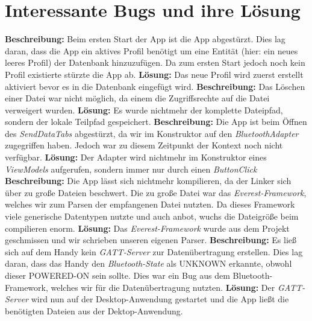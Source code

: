 \documentclass[a4paper]{scrreprt}
\begin{document}
\chapter{Interessante Bugs und ihre Lösung}
\textbf{Beschreibung:} Beim ersten Start der App ist die App abgestürzt. Dies lag daran, dass die App ein aktives Profil benötigt um eine Entität (hier: ein neues leeres Profil) der Datenbank hinzuzufügen. Da zum ersten Start jedoch noch kein Profil existierte stürzte die App ab.
\textbf{Lösung:} Das neue Profil wird zuerst erstellt aktiviert bevor es in die Datenbank eingefügt wird. \newline \newline
\textbf{Beschreibung:} Das Löschen einer Datei war nicht möglich, da einem die Zugriffsrechte auf die Datei verweigert wurden. \newline
\textbf{Lösung:} Es wurde nichtmehr der komplette Dateipfad, sondern der lokale Teilpfad gespeichert. \newline \newline
\textbf{Beschreibung:} Die App ist beim Öffnen des \textit{SendDataTabs} abgestürzt, da wir im Konstruktor auf den \textit{BluetoothAdapter} zugegriffen haben. Jedoch war zu diesem Zeitpunkt der Kontext noch nicht verfügbar. \newline
\textbf{Lösung:} Der Adapter wird nichtmehr im Konstruktor eines \textit{ViewModels} aufgerufen, sondern immer nur durch einen \textit{ButtonClick} \newline \newline
\textbf{Beschreibung: }Die App lässt sich nichtmehr kompilieren, da der Linker sich über zu große Dateien beschwert. Die zu große Datei war das \textit{Everest-Framework}, welches wir zum Parsen der empfangenen Datei nutzten. Da dieses Framework viele generische Datentypen nutzte und auch anbot, wuchs die Dateigröße beim compilieren enorm.\newline
\textbf{Lösung: }Das \textit{Everest-Framework} wurde aus dem Projekt geschmissen und wir schrieben unseren eigenen Parser. \newline \newline
\textbf{Beschreibung:} Es ließ sich auf dem Handy kein \textit{GATT-Server} zur Datenübertragung erstellen. Dies lag daran, dass das Handy den \textit{Bluetooth-State} als \dq{}UNKNOWN\dq{} erkannte, obwohl dieser \dq{}POWERED-ON\dq{} sein sollte. Dies war ein Bug aus dem Bluetooth-Framework, welches wir für die Datenübertragung nutzten. \newline
\textbf{Lösung:} Der \textit{GATT-Server} wird nun auf der Desktop-Anwendung gestartet und die App ließt die benötigten Dateien aus der Dektop-Anwendung.
\end{document}
